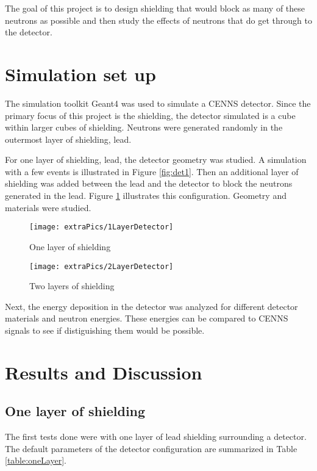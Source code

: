 \documentclass[12pt]{article}
\begin{document}
The goal of this project is to design shielding that would block as many of these neutrons as possible and then study the effects of neutrons that do get through to the detector.

\section{Simulation set up}

The simulation toolkit Geant4 was used to simulate a CENNS detector. Since the primary focus of this project is the shielding, the detector simulated is a cube within larger cubes of shielding. Neutrons were generated randomly in the outermost layer of shielding, lead.

For one layer of shielding, lead, the detector geometry was studied. A simulation with a few events is illustrated in Figure \ref{fig:det1}. Then an additional layer of shielding was added between the lead and the detector to block the neutrons generated in the lead. Figure \ref{fig:det2} illustrates this configuration. Geometry and materials were studied. 
\begin{figure}[H]
  \centering
  \begin{minipage}[t]{0.45\linewidth}
    \texttt{[image: extraPics/1LayerDetector]}
    \caption{One layer of shielding}
    \label{fig:det1}
  \end{minipage}
  \quad
  \begin{minipage}[t]{0.45\linewidth}
    \texttt{[image: extraPics/2LayerDetector]}
    \caption{Two layers of shielding}
    \label{fig:det2}
  \end{minipage}
\end{figure}

Next, the energy deposition in the detector was analyzed for different detector materials and neutron energies. These energies can be compared to CENNS signals to see if distiguishing them would be possible.

\section{Results and Discussion}

\subsection{One layer of shielding}

The first tests done were with one layer of lead shielding surrounding a detector. The default parameters of the detector configuration are summarized in Table \ref{table:oneLayer}.
\end{document}
